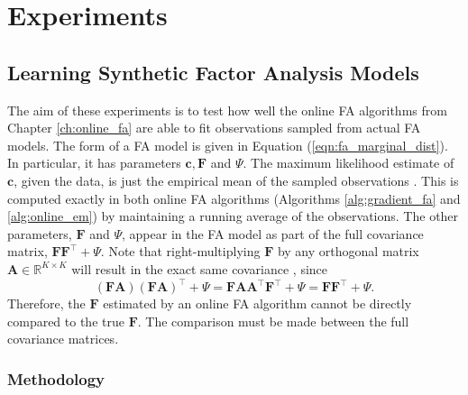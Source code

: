 \documentclass[msc,deptreport.inf]{infthesis} %
\newcommand{\matr}[1]{\mathbf{#1}}
\newcommand{\R}{\mathbb R}
\begin{document}
\section{Experiments}

\subsection{Learning Synthetic Factor Analysis Models}\label{ch:online_fa_experiments}

The aim of these experiments is to test how well the online FA algorithms from Chapter \ref{ch:online_fa} are able to fit observations sampled from actual FA models. The form of a FA model is given in Equation (\ref{eqn:fa_marginal_dist}). In particular, it has parameters $\matr{c}, \matr{F}$ and $\Psi$. The maximum likelihood estimate of $\matr{c}$, given the data, is just the empirical mean of the sampled observations \cite{barber2007}. This is computed exactly in both online FA algorithms (Algorithms \ref{alg:gradient_fa} and \ref{alg:online_em}) by maintaining a running average of the observations. The other parameters, $\matr{F}$ and $\Psi$, appear in the FA model as part of the full covariance matrix,  $\matr{F}\matr{F}^\intercal + \Psi$. Note that right-multiplying $\matr{F}$ by any orthogonal matrix $\matr{A} \in \R^{K \times K}$ will result in the exact same covariance \cite{barber2007}, since
\begin{equation}
	(\matr{F} \matr{A}) (\matr{F} \matr{A})^\intercal + \Psi
	= \matr{F} \matr{A} \matr{A}^\intercal \matr{F}^\intercal + \Psi
	= \matr{F} \matr{F}^\intercal + \Psi.
\end{equation}
Therefore, the $\matr{F}$ estimated by an online FA algorithm cannot be directly compared to the true $\matr{F}$. The comparison must be made between the full covariance matrices.  

\subsubsection{Methodology}
\end{document}
